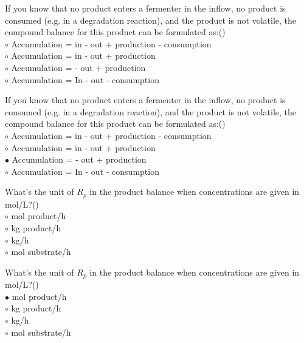 \documentclass[]{beamer}
\begin{document}
\begin{frame}[shrink] {}
\addtocounter{questions}{1}
\color{blue}
If you know that no product enters a fermenter in the inflow, no product is consumed (e.g. in a degradation reaction), and the product is not volatile, the compound balance for this product can be formulated as:()\\
\color{black}
\setlength{\parindent}{-0.4cm}
{\color{red}$\circ$}  Accumulation = in - out + production - consumption\\
{\color{red}$\circ$} Accumulation = in - out + production \\
{\color{red}$\circ$} Accumulation = - out + production \\
{\color{red}$\circ$} Accumulation = In - out - consumption
\end{frame}
\begin{frame}[shrink] {}
\addtocounter{answers}{1}
\color{blue}
If you know that no product enters a fermenter in the inflow, no product is consumed (e.g. in a degradation reaction), and the product is not volatile, the compound balance for this product can be formulated as:()\\
\color{black}
\setlength{\parindent}{-0.4cm}
{\color{red}$\circ$}  Accumulation = in - out + production - consumption\\
{\color{red}$\circ$} Accumulation = in - out + production \\
{\color{red}$\bullet$} Accumulation = - out + production \\
{\color{red}$\circ$} Accumulation = In - out - consumption
\end{frame}

\begin{frame}[shrink] {}
\addtocounter{questions}{1}
\color{blue}
What’s the unit of $R_p$ in the product balance when concentrations are given in mol/L?()\\
\color{black}
\setlength{\parindent}{-0.4cm}
{\color{red}$\circ$} mol product/h \\
{\color{red}$\circ$} kg product/h\\
{\color{red}$\circ$} kg/h\\
{\color{red}$\circ$} mol substrate/h\\
\end{frame}
\begin{frame}[shrink] {}
\addtocounter{answers}{1}
\color{blue}
What’s the unit of $R_p$ in the product balance when concentrations are given in mol/L?()\\
\color{black}
\setlength{\parindent}{-0.4cm}
{\color{red}$\bullet$} mol product/h \\
{\color{red}$\circ$} kg product/h\\
{\color{red}$\circ$} kg/h\\
{\color{red}$\circ$} mol substrate/h\\
\end{frame}
\end{document}
